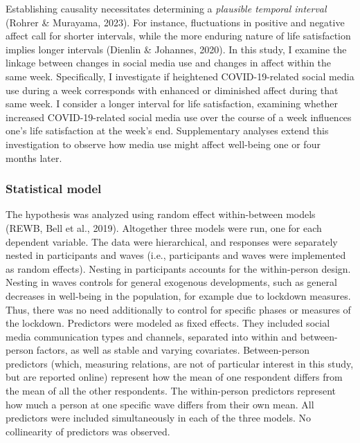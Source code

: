\documentclass[
  man,mask,floatsintext]{apa7}
\begin{document}
Establishing causality necessitates determining a \emph{plausible temporal interval} (Rohrer \& Murayama, 2023).
For instance, fluctuations in positive and negative affect call for shorter intervals, while the more enduring nature of life satisfaction implies longer intervals (Dienlin \& Johannes, 2020).
In this study, I examine the linkage between changes in social media use and changes in affect within the same week.
Specifically, I investigate if heightened COVID-19-related social media use during a week corresponds with enhanced or diminished affect during that same week.
I consider a longer interval for life satisfaction, examining whether increased COVID-19-related social media use over the course of a week influences one's life satisfaction at the week's end.
Supplementary analyses extend this investigation to observe how media use might affect well-being one or four months later.

\subsubsection{Statistical model}\label{statistical-model}

The hypothesis was analyzed using random effect within-between models (REWB, Bell et al., 2019).
Altogether three models were run, one for each dependent variable.
The data were hierarchical, and responses were separately nested in participants and waves (i.e., participants and waves were implemented as random effects).
Nesting in participants accounts for the within-person design.
Nesting in waves controls for general exogenous developments, such as general decreases in well-being in the population, for example due to lockdown measures.
Thus, there was no need additionally to control for specific phases or measures of the lockdown.
Predictors were modeled as fixed effects.
They included social media communication types and channels, separated into within and between-person factors, as well as stable and varying covariates.
Between-person predictors (which, measuring relations, are not of particular interest in this study, but are reported online) represent how the mean of one respondent differs from the mean of all the other respondents.
The within-person predictors represent how much a person at one specific wave differs from their own mean.
All predictors were included simultaneously in each of the three models.
No collinearity of predictors was observed.
\end{document}
